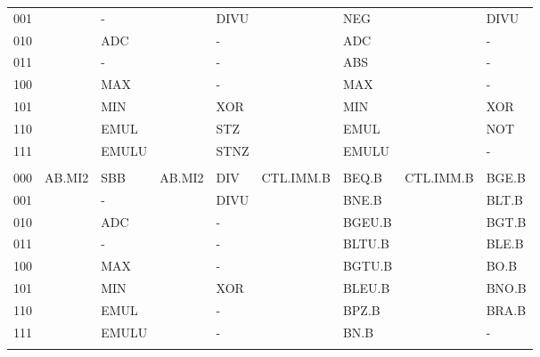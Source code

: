 \begin{table}
\begin{center}
\begin{tabular}{l|ll|ll|ll|ll}
001  &            & -        &           & DIVU            &            & NEG             &            & DIVU      \\
010  &            & ADC      &           & -               &            & ADC             &            & -         \\
011  &            & -        &           & -               &            & ABS             &            & -         \\
100  &            & MAX      &           & -               &            & MAX             &            & -         \\
101  &            & MIN      &           & XOR             &            & MIN             &            & XOR       \\
110  &            & EMUL     &           & STZ             &            & EMUL            &            & NOT       \\
111  &            & EMULU    &           & STNZ            &            & EMULU           &            & -         \\
     &            &          &           &                 &            &                 &            &           \\
000  & AB.MI2     & SBB      & AB.MI2    & DIV             & CTL.IMM.B  & BEQ.B           & CTL.IMM.B  & BGE.B     \\
001  &            & -        &           & DIVU            &            & BNE.B           &            & BLT.B     \\
010  &            & ADC      &           & -               &            & BGEU.B          &            & BGT.B     \\
011  &            & -        &           & -               &            & BLTU.B          &            & BLE.B     \\
100  &            & MAX      &           & -               &            & BGTU.B          &            & BO.B      \\
101  &            & MIN      &           & XOR             &            & BLEU.B          &            & BNO.B     \\
110  &            & EMUL     &           & -               &            & BPZ.B           &            & BRA.B     \\
111  &            & EMULU    &           & -               &            & BN.B            &            & -         \\
     &            &          &           &                 &            &                 &            &           \\

\end{tabular}
\end{center}
\end{table}

